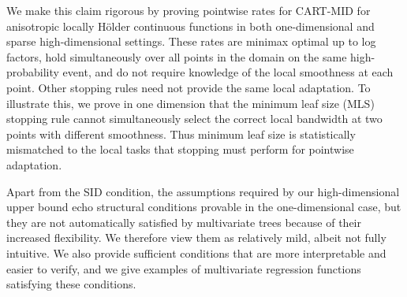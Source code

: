 \documentclass[11pt]{article}
\theoremstyle{plain}
\theoremstyle{definition}
\theoremstyle{remark}
\theoremstyle{plain}
\newcommand{\bx}{\mathbf{x}}
\newcommand{\1}{\mathbbm{1}}
\begin{document}


We make this claim rigorous by proving pointwise rates for CART-MID for anisotropic locally H\"older continuous functions in both one-dimensional and sparse high-dimensional settings. 
These rates are minimax optimal up to log factors, hold simultaneously over all points in the domain on the same high-probability event, and do not require knowledge of the local smoothness at each point.
Other stopping rules need not provide the same local adaptation.
To illustrate this, we prove in one dimension that the minimum leaf size (MLS) stopping rule cannot simultaneously select the correct local bandwidth at two points with different smoothness. 
Thus minimum leaf size is statistically mismatched to the local tasks that stopping must perform for pointwise adaptation.

Apart from the SID condition, the assumptions required by our high-dimensional upper bound echo structural conditions provable in the one-dimensional case, but they are not automatically satisfied by multivariate trees because of their increased flexibility.
We therefore view them as relatively mild, albeit not fully intuitive.
We also provide sufficient conditions that are more interpretable and easier to verify, and we give examples of multivariate regression functions satisfying these conditions.
\end{document}
